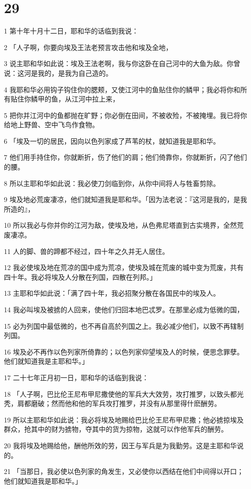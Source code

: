 \chapter{29}

\par 1 第十年十月十二日，耶和华的话临到我说：
\par 2 「人子啊，你要向埃及王法老预言攻击他和埃及全地，
\par 3 说主耶和华如此说：埃及王法老啊，我与你这卧在自己河中的大鱼为敌。你曾说：这河是我的，是我为自己造的。
\par 4 我耶和华必用钩子钩住你的腮颊，又使江河中的鱼贴住你的鳞甲；我必将你和所有贴住你鳞甲的鱼，从江河中拉上来，
\par 5 把你并江河中的鱼都抛在旷野；你必倒在田间，不被收殓，不被掩埋。我已将你给地上野兽、空中飞鸟作食物。
\par 6 「埃及一切的居民，因向以色列家成了芦苇的杖，就知道我是耶和华。
\par 7 他们用手持住你，你就断折，伤了他们的肩；他们倚靠你，你就断折，闪了他们的腰。
\par 8 所以主耶和华如此说：我必使刀剑临到你，从你中间将人与牲畜剪除。
\par 9 埃及地必荒废凄凉，他们就知道我是耶和华。「因为法老说：『这河是我的，是我所造的』，
\par 10 所以我必与你并你的江河为敌，使埃及地，从色弗尼塔直到古实境界，全然荒废凄凉。
\par 11 人的脚、兽的蹄都不经过，四十年之久并无人居住。
\par 12 我必使埃及地在荒凉的国中成为荒凉，使埃及城在荒废的城中变为荒废，共有四十年。我必将埃及人分散在列国，四散在列邦。」
\par 13 主耶和华如此说：「满了四十年，我必招聚分散在各国民中的埃及人。
\par 14 我必叫埃及被掳的人回来，使他们归回本地巴忒罗。在那里必成为低微的国，
\par 15 必为列国中最低微的，也不再自高於列国之上。我必减少他们，以致不再辖制列国。
\par 16 埃及必不再作以色列家所倚靠的；以色列家仰望埃及人的时候，便思念罪孽。他们就知道我是主耶和华。」
\par 17 二十七年正月初一日，耶和华的话临到我说：
\par 18 「人子啊，巴比伦王尼布甲尼撒使他的军兵大大效劳，攻打推罗，以致头都光秃，肩都磨破；然而他和他的军兵攻打推罗，并没有从那里得什麽酬劳。
\par 19 所以主耶和华如此说：我必将埃及地赐给巴比伦王尼布甲尼撒；他必掳掠埃及群众，抢其中的财为掳物，夺其中的货为掠物，这就可以作他军兵的酬劳。
\par 20 我将埃及地赐给他，酬他所效的劳，因王与军兵是为我勤劳。这是主耶和华说的。
\par 21 「当那日，我必使以色列家的角发生，又必使你以西结在他们中间得以开口；他们就知道我是耶和华。」

